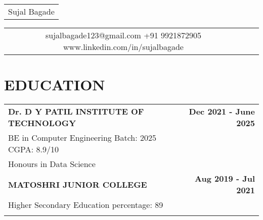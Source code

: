 \documentclass[a4paper,8pt]{article}
\begin{document}
\fontsize{10}{12}\selectfont


\pagestyle{empty} 

\begin{tabularx}{\linewidth}{@{} C @{}}
\Huge{Sujal Bagade} \\[6pt]
\end{tabularx}

\begin{tabularx}{\linewidth}{@{} C @{} C @{} C}
{{\raisebox{-0.05\height}{\faEnvelope} sujalbagade123@gmail.com}}  \hspace{0.2cm}
{{\raisebox{-0.05\height}{\faMobile} +91 9921872905}} \hspace{0.2cm}
{{{\raisebox{-0.05\height}{\faLinkedin} www.linkedin.com/in/sujalbagade
}}}
\end{tabularx}

\section{\textbf{EDUCATION}}
\begin{tabularx}{\linewidth}{@{} X r @{}}
    \textbf{Dr. D Y PATIL INSTITUTE OF TECHNOLOGY} & \textbf{Dec 2021 - June 2025} \\
    BE in Computer Engineering  Batch: 2025 \hspace{0.2cm} CGPA: 8.9/10 \\
    Honours in Data Science\\
    \textbf{MATOSHRI JUNIOR COLLEGE} & \textbf{Aug 2019 - Jul 2021} \\
    Higher Secondary Education \hspace{0.2cm}  percentage: 89 \\
    \\
\end{tabularx}

\end{document}
